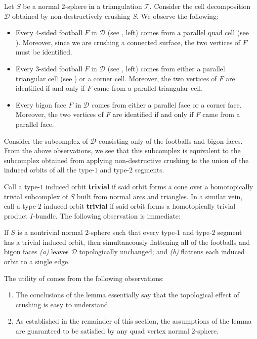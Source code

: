 \documentclass[a4paper,UKenglish,cleveref, autoref, thm-restate]{lipics-v2021}
\newcommand{\tri}{\mathcal{T}}
\begin{document}
Let $S$ be a normal $2$-sphere in a triangulation $\tri$. Consider the cell decomposition $\mathcal{D}$ obtained by non-destructively crushing $S$. We observe the following:
\begin{itemize}
\item Every $4$-sided football $F$ in $\mathcal{D}$ (see , left) comes from a parallel quad cell
(see ).
Moreover, since we are crushing a connected surface, the two vertices of $F$ must be identified.

\item Every $3$-sided football $F$ in $\mathcal{D}$ (see , left) comes from either
a parallel triangular cell (see ) or a corner cell. Moreover, the two vertices of $F$ are identified if and only if $F$ came from a parallel triangular cell.

\item Every bigon face $F$ in $\mathcal{D}$ comes from either a parallel face or a corner face.
Moreover, the two vertices of $F$ are identified if and only if $F$ came from a parallel face.


\end{itemize}
Consider the subcomplex of $\mathcal{D}$ consisting only of the footballs and bigon faces.
From the above observations, we see that this subcomplex is equivalent to the subcomplex obtained from
applying non-destructive crushing to the union of the induced orbits of all the type-$1$ and type-$2$ segments.

Call a type-$1$ induced orbit \textbf{trivial} if said orbit forms a cone over a
homotopically trivial subcomplex of $S$ built from normal arcs and triangles.
In a similar vein, call a type-$2$ induced orbit \textbf{trivial} if said orbit forms a homotopically trivial product $I$-bundle.
The following observation is immediate:

\begin{lemma}\label{lem:flattenToEdge}
If $S$ is a nontrivial normal $2$-sphere such that every type-$1$ and type-$2$ segment has a trivial induced orbit, then
simultaneously flattening all of the footballs and bigon faces {\em (a)} leaves $\mathcal{D}$ topologically unchanged; and {\em (b)} flattens each induced orbit to a single edge.
\end{lemma}

The utility of  comes from the following observations:
\begin{enumerate}
\item The conclusions of the lemma essentially say that the topological effect of crushing is easy to understand.
\item As established in the remainder of this section, the assumptions of the lemma are guaranteed to be satisfied by any quad vertex normal $2$-sphere.
\end{enumerate}
\end{document}

